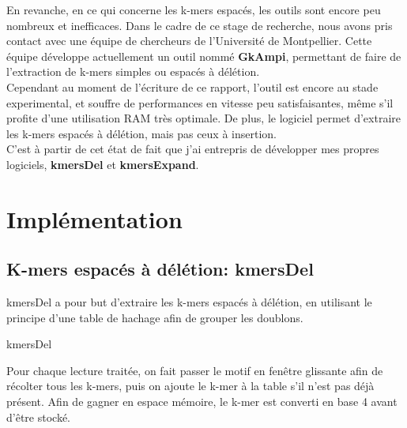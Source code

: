 \documentclass{report}
\begin{document}
      En revanche, en ce qui concerne les k-mers espacés, les outils sont encore peu nombreux et inefficaces.
      Dans le cadre de ce stage de recherche, nous avons pris contact avec une équipe de chercheurs de l'Université de Montpellier. Cette équipe développe actuellement un outil nommé \textbf{GkAmpi}\cite{Mancheron}, permettant de faire de l'extraction de k-mers simples ou espacés à délétion.\\

      Cependant au moment de l'écriture de ce rapport, l'outil est encore au stade experimental, et souffre de performances en vitesse peu satisfaisantes, même s'il profite d'une utilisation RAM très optimale. De plus, le logiciel permet d'extraire les k-mers espacés à délétion, mais pas ceux à insertion.\\

      C'est à partir de cet état de fait que j'ai entrepris de développer mes propres logiciels, \textbf{kmersDel} et \textbf{kmersExpand}.
  \chapter{Implémentation}
    \section{K-mers espacés à délétion: kmersDel}
      kmersDel a pour but d'extraire les k-mers espacés à délétion, en utilisant le principe d'une table de hachage afin de grouper les doublons.\bigskip\\
      \normalsize
      \begin{algorithm}[H]{
        \caption{kmersDel}
      }\end{algorithm}\bigskip
      \large
      Pour chaque lecture traitée, on fait passer le motif en fenêtre glissante afin de récolter tous les k-mers, puis on ajoute le k-mer à la table s'il n'est pas déjà présent. Afin de gagner en espace mémoire, le k-mer est converti en base 4 avant d'être stocké.\\
\end{document}
